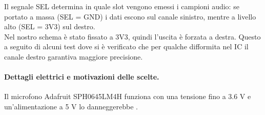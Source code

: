   
  \begin{table}[H]
    \centering
    \label{tab:i2s_pins}
    \caption{Mappatura hardware dei pin I$^2$S tra ESP32 e microfono SPH0645LM4H.}
  
  \end{table}
  
  \noindent
  Il segnale SEL determina in quale slot vengono emessi i campioni audio: se portato a massa (SEL = GND) i dati escono sul canale sinistro,
  mentre a livello alto (SEL = 3V3) sul destro. \\
  Nel nostro schema è stato fissato a 3V3, quindi l’uscita è forzata a destra.
  Questo a seguito di alcuni test dove si è verificato che per qualche difformita nel IC il canale destro garantiva maggiore precisione.\\
  
  \paragraph{Dettagli elettrici e motivazioni delle scelte.}
  Il microfono Adafruit SPH0645LM4H funziona con una tensione fino a 3.6 V e un’alimentazione a 5 V lo danneggerebbe 
  \citep[p.~2]{adafruit-sph0645-datasheet}.
    
